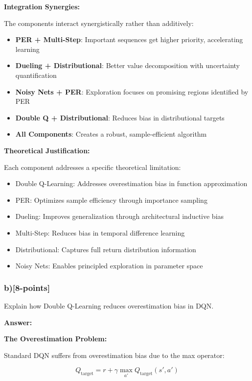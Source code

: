 \documentclass[12pt]{article}
\begin{document}
{{\textbf{Integration Synergies:}

The components interact synergistically rather than additively:

\begin{itemize}
\item \textbf{PER + Multi-Step}: Important sequences get higher priority, accelerating learning
\item \textbf{Dueling + Distributional}: Better value decomposition with uncertainty quantification
\item \textbf{Noisy Nets + PER}: Exploration focuses on promising regions identified by PER
\item \textbf{Double Q + Distributional}: Reduces bias in distributional targets
\item \textbf{All Components}: Creates a robust, sample-efficient algorithm
\end{itemize}

\textbf{Theoretical Justification:}

Each component addresses a specific theoretical limitation:
\begin{itemize}
\item Double Q-Learning: Addresses overestimation bias in function approximation
\item PER: Optimizes sample efficiency through importance sampling
\item Dueling: Improves generalization through architectural inductive bias
\item Multi-Step: Reduces bias in temporal difference learning
\item Distributional: Captures full return distribution information
\item Noisy Nets: Enables principled exploration in parameter space
\end{itemize}

\subsubsection{b)[8-points]} Explain how Double Q-Learning reduces overestimation bias in DQN.

\textbf{Answer:}

\textbf{The Overestimation Problem:}

Standard DQN suffers from overestimation bias due to the max operator:

\begin{equation}
Q_{\text{target}} = r + \gamma \max_{a'} Q_{\text{target}}(s', a')
\end{equation}

}}
\end{document}
